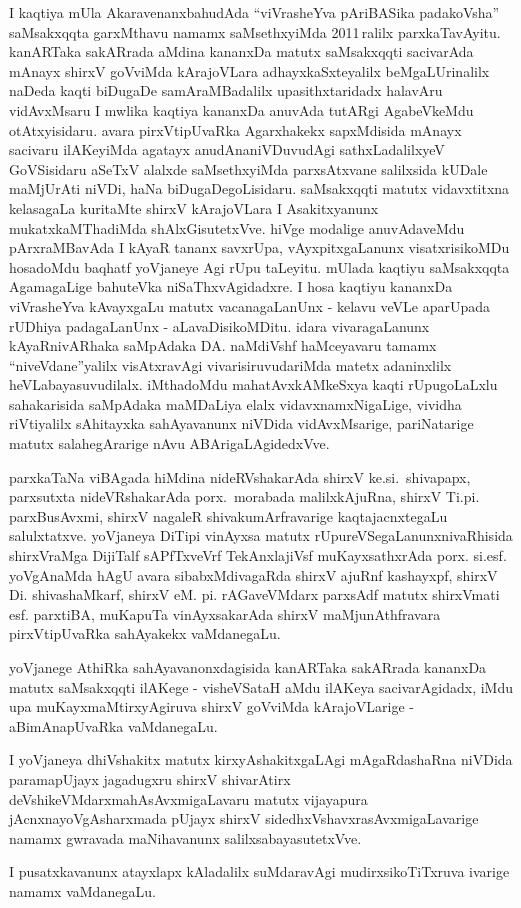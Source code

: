 I kaqtiya mUla AkaravenanxbahudAda ``viVrasheYva pAriBASika padakoVsha'' saMsakxqqta garxMthavu namamx saMsethxyiMda 2011\,ralilx parxkaTavAyitu. kanARTaka sakARrada aMdina kananxDa matutx saMsakxqqti sacivarAda mAnayx shirxV goVviMda kArajoVLara adhayxkaSxte\-yalilx beMgaLUrinalilx naDeda kaqti biDugaDe samAraMBadalilx upasithxtaridadx halavAru vidAvxMsaru I mwlika kaqtiya kananxDa anuvAda \hbox{tutARgi} AgabeVkeMdu otAtxyisidaru. avara pirxVtipUvaRka Agarxhakekx sapxMdisida mAnayx sacivaru ilAKeyiMda agatayx anudAna\break niVDuvudAgi sathxLadalilxyeV GoVSisidaru aSeTxV alalxde saMsethxyiMda parxsAtxvane salilxsida kUDale maMjUrAti niVDi, haNa biDugaDegoLisidaru. saMsakxqqti matutx vidavxtitxna kelasagaLa kuritaMte shirxV kArajoVLara I Asakitxyanunx mukatxkaMThadiMda shAlxGisutetxVve. hiVge modalige anuvAdaveMdu pArxraMBavAda I kAyaR tananx savxrUpa, vAyxpitxgaLanunx visatxrisikoMDu hosadoMdu baqhatf \hbox{yoVjaneye} Agi rUpu taLeyitu. mUlada kaqtiyu saMsakxqqta AgamagaLige bahuteVka niSaThxvAgidadxre. I hosa kaqtiyu kananxDa viVrasheYva kAvayxgaLu matutx vacanagaLanUnx - kelavu veVLe aparUpada rUDhiya padagaLanUnx - aLavaDisikoMDitu. idara vivara\-gaLanunx kAyaR\-nivARhaka saMpAdaka DA. naMdiVshf haMceyavaru tamamx ``niveVdane''yalilx visAtxravAgi vivarisiruvudariMda matetx adaninxlilx heVLabayasuvudilalx. iMthadoMdu mahatAvxkAMkeSxya kaqti rUpugoLaLxlu sahakarisida saMpAdaka maMDaLiya elalx vidavxnamxNigaLige, vividha riVtiyalilx sAhitayxka sahAyavanunx niVDida vidAvxMsarige, pariNatarige matutx salahegArarige nAvu ABArigaLAgidedxVve.

\medskip

parxkaTaNa viBAgada hiMdina nideRVshakarAda shirxV ke.si.~shivapapx, parxsutxta nideVRshakarAda porx.~morabada malilxkAjuRna, shirxV Ti.pi. parxBusAvxmi, shirxV nagaleR shivakumArfravarige kaqtajacnxtegaLu salulxtatxve. yoVjaneya DiTipi vinAyxsa matutx rUpureVSegaLanunx\break nivaRhisida shirxVraMga DijiTalf sAPfTxveVrf TekAnxlajiVsf muKayxsathxrAda porx. si.esf. \hbox{yoVgAnaMda} hAgU avara sibabxMdivagaRda shirxV ajuRnf kashayxpf, shirxV Di. shivashaMkarf, shirxV eM. pi. rAGaveVMdarx parxsAdf matutx shirxVmati esf. parxtiBA, muKapuTa vinAyxsakarAda shirxV maMjunAthfravara pirxVtipUvaRka sahAyakekx vaMdanegaLu.

\medskip

yoVjanege AthiRka sahAyavanonxdagisida kanARTaka sakARrada kananxDa matutx saMsakxqqti ilAKege - visheVSataH aMdu ilAKeya sacivarAgidadx, iMdu upa muKayxmaMtirxyAgiruva shirxV goVviMda kArajoVLarige - aBimAnapUvaRka vaMdanegaLu.

\medskip

I yoVjaneya dhiVshakitx matutx kirxyAshakitxgaLAgi mAgaRdashaRna niVDida paramapUjayx jagadugxru shirxV shivarAtirx deVshikeVMdarx\break mahAsAvxmigaLavaru matutx vijayapura jAcnxnayoVgAsharxmada pUjayx shirxV sidedhxVshavxrasAvxmigaLavarige namamx gwravada maNihavanunx salilxsa\-bayasutetxVve.

\medskip

I pusatxkavanunx atayxlapx kAladalilx suMdaravAgi mudirxsikoTiTxruva \underline{\qquad\qquad} ivarige namamx vaMdanegaLu.


